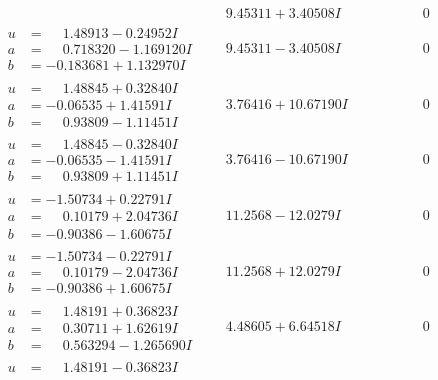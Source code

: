 \documentclass[1p]{elsarticle_modified}
\theoremstyle{definition}
\begin{document}
$$\begin{array}{c|c|c}
 & \phantom{-}9.45311 + 3.40508 I & \phantom{-0.000000 } 0 \\ \hline\begin{aligned}
u &= \phantom{-}1.48913 - 0.24952 I \\
a &= \phantom{-}0.718320 - 1.169120 I \\
b &= -0.183681 + 1.132970 I\end{aligned}
 & \phantom{-}9.45311 - 3.40508 I & \phantom{-0.000000 } 0 \\ \hline\begin{aligned}
u &= \phantom{-}1.48845 + 0.32840 I \\
a &= -0.06535 + 1.41591 I \\
b &= \phantom{-}0.93809 - 1.11451 I\end{aligned}
 & \phantom{-}3.76416 + 10.67190 I & \phantom{-0.000000 } 0 \\ \hline\begin{aligned}
u &= \phantom{-}1.48845 - 0.32840 I \\
a &= -0.06535 - 1.41591 I \\
b &= \phantom{-}0.93809 + 1.11451 I\end{aligned}
 & \phantom{-}3.76416 - 10.67190 I & \phantom{-0.000000 } 0 \\ \hline\begin{aligned}
u &= -1.50734 + 0.22791 I \\
a &= \phantom{-}0.10179 + 2.04736 I \\
b &= -0.90386 - 1.60675 I\end{aligned}
 & \phantom{-}11.2568 - 12.0279 I & \phantom{-0.000000 } 0 \\ \hline\begin{aligned}
u &= -1.50734 - 0.22791 I \\
a &= \phantom{-}0.10179 - 2.04736 I \\
b &= -0.90386 + 1.60675 I\end{aligned}
 & \phantom{-}11.2568 + 12.0279 I & \phantom{-0.000000 } 0 \\ \hline\begin{aligned}
u &= \phantom{-}1.48191 + 0.36823 I \\
a &= \phantom{-}0.30711 + 1.62619 I \\
b &= \phantom{-}0.563294 - 1.265690 I\end{aligned}
 & \phantom{-}4.48605 + 6.64518 I & \phantom{-0.000000 } 0 \\ \hline\begin{aligned}
u &= \phantom{-}1.48191 - 0.36823 I \\

\end{aligned}
\end{array}$$
\end{document}
